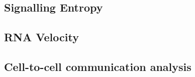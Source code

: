 \subsection*{Signalling Entropy}


\subsection*{RNA Velocity}


\subsection{Cell-to-cell communication analysis}

